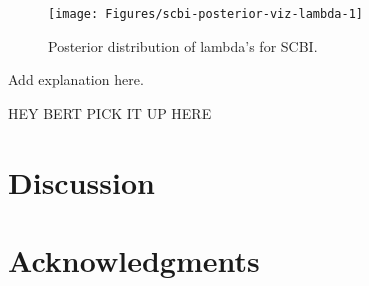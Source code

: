 \documentclass[12pt]{article}
\begin{document}
\begin{figure}

{\centering \texttt{[image: Figures/scbi-posterior-viz-lambda-1]} 

}

\caption{Posterior distribution of lambda's for SCBI.}\label{fig:scbi-posterior-viz-lambda}
\end{figure}

Add explanation here.

HEY BERT PICK IT UP HERE

\hypertarget{discussion}{%
\section{Discussion}\label{discussion}}

\hypertarget{acknowledgments}{%
\section{Acknowledgments}\label{acknowledgments}}



\end{document}

